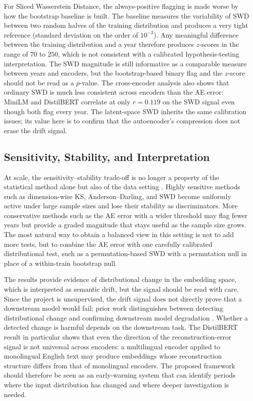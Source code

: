 \documentclass[conference]{IEEEtran}
\begin{document}
For Sliced Wasserstein Distance, the always-positive flagging is made worse by how the bootstrap baseline is built. The baseline measures the variability of SWD between two random halves of the training distribution and produces a very tight reference (standard deviation on the order of $10^{-3}$). Any meaningful difference between the training distribution and a year therefore produces $z$-scores in the range of $70$ to $250$, which is not consistent with a calibrated hypothesis-testing interpretation. The SWD magnitude is still informative as a comparable measure between years and encoders, but the bootstrap-based binary flag and the $z$-score should not be read as a $p$-value. The cross-encoder analysis also shows that ordinary SWD is much less consistent across encoders than the AE error: MiniLM and DistilBERT correlate at only $r = 0.119$ on the SWD signal even though both flag every year. The latent-space SWD inherits the same calibration issues; its value here is to confirm that the autoencoder's compression does not erase the drift signal.

\subsection{Sensitivity, Stability, and Interpretation}

At scale, the sensitivity--stability trade-off is no longer a property of the statistical method alone but also of the data setting \cite{gama2014,lu2018}. Highly sensitive methods such as dimension-wise KS, Anderson--Darling, and SWD become uniformly active under large sample sizes and lose their stability as discriminators. More conservative methods such as the AE error with a wider threshold may flag fewer years but provide a graded magnitude that stays useful as the sample size grows. The most natural way to obtain a balanced view in this setting is not to add more tests, but to combine the AE error with one carefully calibrated distributional test, such as a permutation-based SWD with a permutation null in place of a within-train bootstrap null.

The results provide evidence of distributional change in the embedding space, which is interpreted as semantic drift, but the signal should be read with care. Since the project is unsupervised, the drift signal does not directly prove that a downstream model would fail; prior work distinguishes between detecting distributional change and confirming downstream model degradation \cite{lu2018,bayram2022}. Whether a detected change is harmful depends on the downstream task. The DistilBERT result in particular shows that even the direction of the reconstruction-error signal is not universal across encoders: a multilingual encoder applied to monolingual English text may produce embeddings whose reconstruction structure differs from that of monolingual encoders. The proposed framework should therefore be seen as an early-warning system that can identify periods where the input distribution has changed and where deeper investigation is needed.
\end{document}

